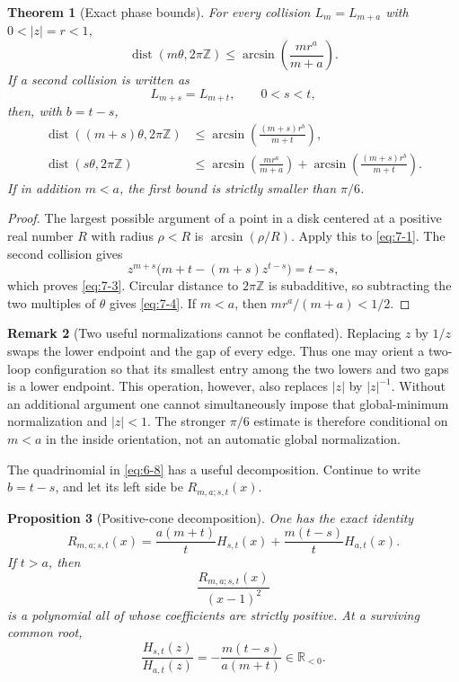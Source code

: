 \documentclass[11pt]{article}
\numberwithin{equation}{section}
\newtheorem{theorem}{Theorem}[section]
\newtheorem{proposition}[theorem]{Proposition}
\theoremstyle{definition}
\newtheorem{remark}[theorem]{Remark}
\newcommand{\Z}{\mathbb Z}
\begin{document}
\begin{theorem}[Exact phase bounds]\label{thm:phase}
For every collision \(L_m=L_{m+a}\) with \(0<|z|=r<1\),
\begin{equation}
 \operatorname{dist}(m\theta,2\pi\Z)
 \leq
 \arcsin\!\left(\frac{mr^a}{m+a}\right).
 \label{eq:7-2}
\end{equation}
If a second collision is written as
\[
 L_{m+s}=L_{m+t},\qquad 0<s<t,
\]
then, with \(b=t-s\),
\begin{align}
 \operatorname{dist}((m+s)\theta,2\pi\Z)
 &\leq
 \arcsin\!\left(\frac{(m+s)r^b}{m+t}\right),
 \label{eq:7-3}\\
 \operatorname{dist}(s\theta,2\pi\Z)
 &\leq
 \arcsin\!\left(\frac{mr^a}{m+a}\right)
 +\arcsin\!\left(\frac{(m+s)r^b}{m+t}\right).
 \label{eq:7-4}
\end{align}
If in addition \(m<a\), the first bound is strictly smaller than \(\pi/6\).
\end{theorem}

\begin{proof}
The largest possible argument of a point in a disk centered at a positive real
number \(R\) with radius \(\rho<R\) is
\(\arcsin(\rho/R)\).  Apply this to \eqref{eq:7-1}.  The second collision gives
\[
 z^{m+s}\bigl(m+t-(m+s)z^{t-s}\bigr)=t-s,
\]
which proves \eqref{eq:7-3}.  Circular distance to \(2\pi\Z\) is subadditive,
so subtracting the two multiples of \(\theta\) gives \eqref{eq:7-4}.  If
\(m<a\), then \(mr^a/(m+a)<1/2\).
\end{proof}

\begin{remark}[Two useful normalizations cannot be conflated]
Replacing \(z\) by \(1/z\) swaps the lower endpoint and the gap of every
edge.  Thus one may orient a two-loop configuration so that its smallest
entry among the two lowers and two gaps is a lower endpoint.  This operation,
however, also replaces \(|z|\) by \(|z|^{-1}\).  Without an additional
argument one cannot simultaneously impose that global-minimum normalization
and \(|z|<1\).  The stronger \(\pi/6\) estimate is therefore conditional on
\(m<a\) in the inside orientation, not an automatic global normalization.
\end{remark}

The quadrinomial in \eqref{eq:6-8} has a useful decomposition.  Continue to write
\(b=t-s\), and let its left side be \(R_{m,a;s,t}(x)\).

\begin{proposition}[Positive-cone decomposition]\label{prop:positivecone}
One has the exact identity
\begin{equation}
 R_{m,a;s,t}(x)=
 \frac{a(m+t)}{t}H_{s,t}(x)
 +\frac{m(t-s)}{t}H_{a,t}(x).
 \label{eq:7-5}
\end{equation}
If \(t>a\), then
\[
 \frac{R_{m,a;s,t}(x)}{(x-1)^2}
\]
is a polynomial all of whose coefficients are strictly positive.  At a
surviving common root,
\begin{equation}
 \frac{H_{s,t}(z)}{H_{a,t}(z)}
 =-\frac{m(t-s)}{a(m+t)}\in\mathbb R_{<0}.
 \label{eq:7-6}
\end{equation}
\end{proposition}
\end{document}
